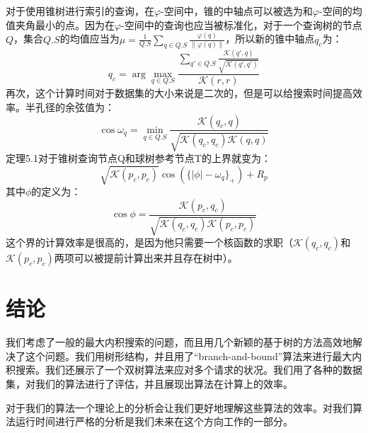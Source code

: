\documentclass[twocolumn,a4paper]{article}
\begin{document}
对于使用锥树进行索引的查询，在$\varphi$-空间中，锥的中轴点可以被选为和$\varphi$-空间的均值夹角最小的点。因为在$\varphi$-空间中的查询也应当被标准化，对于一个查询树的节点$Q$，集合$Q.S$的均值应当为$\mu=\frac{1}{Q.S}\sum_{q \in Q.S}\frac{\varphi(q)}{\|\varphi(q)\|}$，所以新的锥中轴点$q_c$为：
\begin{equation}
q_c = \arg \max_{q\in Q.S}\frac{\sum_{q'\in Q.S}\frac{\mathcal{K}(q',q)}{\sqrt{\mathcal{K}(q',q')}}}{\mathcal{K}(r,r)}
\end{equation}
再次，这个计算时间对于数据集的大小来说是二次的，但是可以给搜索时间提高效率。半孔径的余弦值为：
\begin{equation}
\cos\omega_q = \min_{q \in Q.S}\frac{\mathcal{K}(q_c, q)}{\sqrt{\mathcal{K}(q_c, q_c)\mathcal{K}(q,q)}}
\end{equation}
定理5.1对于锥树查询节点Q和球树参考节点T的上界就变为：
\begin{equation}
\sqrt{\mathcal{K}(p_c, p_c)}\cos(\{|\phi| - \omega_q\}_+) + R_p
\end{equation}
其中$\phi$的定义为：
\begin{equation*}
\cos\phi = \frac{\mathcal{K}(p_c, q_c)}{\sqrt{\mathcal{K}(q_c, q_c)\mathcal{K}(p_c,p_c)}}
\end{equation*}
这个界的计算效率是很高的，是因为他只需要一个核函数的求职（$\mathcal{K}(q_c, q_c)$和$\mathcal{K}(p_c,p_c)$两项可以被提前计算出来并且存在树中）。

\section{结论}

我们考虑了一般的最大内积搜索的问题，而且用几个新颖的基于树的方法高效地解决了这个问题。我们用树形结构，并且用了“branch-and-bound”算法来进行最大内积搜索。我们还展示了一个双树算法来应对多个请求的状况。我们用了各种的数据集，对我们的算法进行了评估，并且展现出算法在计算上的效率。

对于我们的算法一个理论上的分析会让我们更好地理解这些算法的效率。对我们算法运行时间进行严格的分析是我们未来在这个方向工作的一部分。
\end{document}
